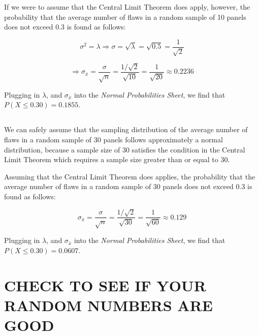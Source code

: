 \documentclass[letterpaper]{article}
\begin{document}
If we were to assume that the Central Limit Theorem does apply, however, the
probability that the average number of flaws in a random sample of 10 panels
does not exceed 0.3 is found as follows:

$$\sigma^2 = \lambda \Rightarrow
 \sigma = \sqrt{\lambda} = \sqrt{0.5} = \frac{1}{\sqrt{2}} $$

$$\Rightarrow \sigma_{\bar{x}} = \frac{\sigma}{\sqrt{n}} =
 \frac{1/\sqrt{2}}{\sqrt{10}} = \frac{1}{\sqrt{20}} \approx 0.2236 $$

Plugging in $\lambda$, and $\sigma_{\bar{x}}$ into the \textit{Normal Probabilities Sheet},
we find that $P(X \leq 0.30) = 0.1855$.

\subsection{}%
We can safely assume that the sampling distribution of the average number of
flaws in a random sample of 30 panels follows approximately a normal
distribution, because a sample size of 30 satisfies the condition in the Central
Limit Theorem which requires a sample size greater than or equal to 30.

Assuming that the Central Limit Theorem does applies, the
probability that the average number of flaws in a random sample of 30 panels
does not exceed 0.3 is found as follows:

$$\sigma_{\bar{x}} = \frac{\sigma}{\sqrt{n}} =
 \frac{1/\sqrt{2}}{\sqrt{30}} = \frac{1}{\sqrt{60}} \approx 0.129 $$

Plugging in $\lambda$, and $\sigma_{\bar{x}}$ into the \textit{Normal Probabilities Sheet},
we find that $P(X \leq 0.30) = 0.0607$.

\section{CHECK TO SEE IF YOUR RANDOM NUMBERS ARE GOOD}%
\end{document}
